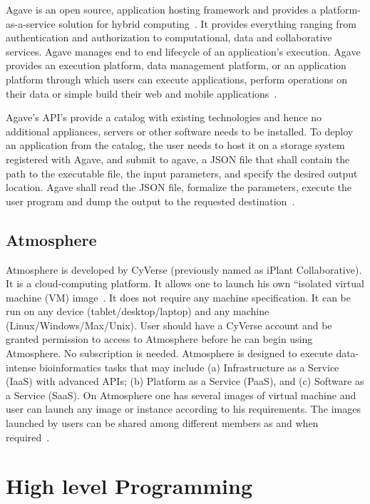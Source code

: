 Agave is an open source, application hosting framework and provides a
platform-as-a-service solution for hybrid
computing~\cite{agave-paper}. It provides everything ranging from
authentication and authorization to computational, data and
collaborative services. Agave manages end to end lifecycle of an
application's execution.  Agave provides an execution platform, data
management platform, or an application platform through which users
can execute applications, perform operations on their data or simple
build their web and mobile applications~\cite{www-agaveapi-features}.

Agave's API's provide a catalog with existing technologies and hence
no additional appliances, servers or other software needs to be
installed. To deploy an application from the catalog, the user needs
to host it on a storage system registered with Agave, and submit to
agave, a JSON file that shall contain the path to the executable file,
the input parameters, and specify the desired output location. Agave
shall read the JSON file, formalize the parameters, execute the user
program and dump the output to the requested
destination~\cite{agave-paper}.

\subsection{Atmosphere}

Atmosphere is developed by CyVerse (previously named as iPlant
Collaborative).  It is a cloud-computing platform. It allows one to
launch his own ``isolated virtual machine (VM) image~\cite{www-at1}.
It does not require any machine specification. It can be run on any
device (tablet/desktop/laptop) and any machine
(Linux/Windows/Max/Unix).  User should have a CyVerse account and be
granted permission to access to Atmosphere before he can begin using
Atmosphere. No subscription is needed.  Atmosphere is designed to
execute data-intense bioinformatics tasks that may include
(a) Infrastructure as a Service (IaaS) with advanced APIs; (b) Platform as
a Service (PaaS), and (c) Software as a Service (SaaS).  On Atmosphere
one has several images of virtual machine and user can launch any
image or instance according to his requirements.  The images launched
by users can be shared among different members as and when
required~\cite{www-at2}.

\section{High level Programming}
\label{S:o-programming}

